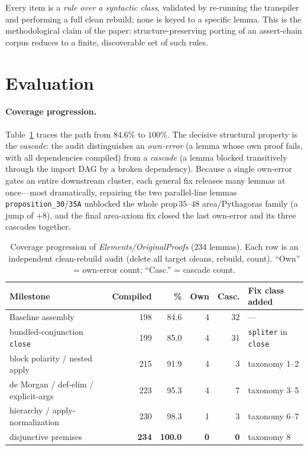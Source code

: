 \documentclass{article}
\begin{document}
Every item is a \emph{rule over a syntactic class}, validated by re-running the transpiler and
performing a full clean rebuild; none is keyed to a specific lemma. This is the methodological
claim of the paper: structure-preserving porting of an assert-chain corpus reduces to a finite,
discoverable set of such rules.

\section{Evaluation}
\label{sec:eval}

\paragraph{Coverage progression.}
Table~\ref{tab:progress} traces the path from $84.6\%$ to $100\%$. The decisive structural
property is the \emph{cascade}: the audit distinguishes an \emph{own-error} (a lemma whose own
proof fails, with all dependencies compiled) from a \emph{cascade} (a lemma blocked transitively
through the import DAG by a broken dependency). Because a single own-error gates an entire
downstream cluster, each general fix releases many lemmas at once---most dramatically, repairing
the two parallel-line lemmas \texttt{proposition\_30}/\texttt{35A} unblocked the whole
$\mathrm{prop}\,35$--$48$ area/Pythagoras family (a jump of $+8$), and the final area-axiom fix
closed the last own-error and its three cascades together.

\begin{table}[t]
  \centering
  \caption{Coverage progression of \emph{Elements/OriginalProofs} ($234$ lemmas). Each row is an
  independent clean-rebuild audit (delete all target oleans, rebuild, count). ``Own'' = own-error
  count; ``Casc.'' = cascade count.}
  \label{tab:progress}
  \begin{tabular}{lrrrrl}
    \toprule
    Milestone & Compiled & \% & Own & Casc. & Fix class added \\
    \midrule
    Baseline assembly               & 198 & 84.6 & 4 & 32 & --- \\
    bundled-conjunction \texttt{close} & 199 & 85.0 & 4 & 31 & \texttt{spliter} in \texttt{close} \\
    block polarity / nested apply   & 215 & 91.9 & 4 &  3 & taxonomy 1--2 \\
    de Morgan / def-elim / explicit-args & 223 & 95.3 & 4 & 7 & taxonomy 3--5 \\
    hierarchy / apply-normalization & 230 & 98.3 & 1 &  3 & taxonomy 6--7 \\
    disjunctive premises            & \textbf{234} & \textbf{100.0} & \textbf{0} & \textbf{0} & taxonomy 8 \\
    \bottomrule
  \end{tabular}
\end{table}
\end{document}
